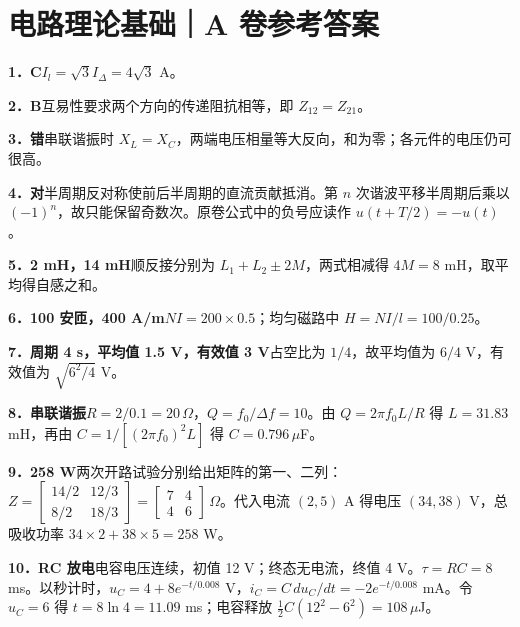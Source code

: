 \documentclass[UTF8,zihao=-4]{ctexart}
\newcommand{\ans}[2]{\par\medskip\noindent\textbf{#1}\quad #2\par}
\begin{document}
\section*{电路理论基础｜A 卷参考答案}
\ans{1．C}{$I_l=\sqrt3 I_\Delta=4\sqrt3$ A。}
\ans{2．B}{互易性要求两个方向的传递阻抗相等，即 $Z_{12}=Z_{21}$。}
\ans{3．错}{串联谐振时 $X_L=X_C$，两端电压相量等大反向，和为零；各元件的电压仍可很高。}
\ans{4．对}{半周期反对称使前后半周期的直流贡献抵消。第 $n$ 次谐波平移半周期后乘以 $(-1)^n$，故只能保留奇数次。原卷公式中的负号应读作 $u(t+T/2)=-u(t)$。}
\ans{5．2 mH，14 mH}{顺反接分别为 $L_1+L_2\pm2M$，两式相减得 $4M=8$ mH，取平均得自感之和。}
\ans{6．100 安匝，400 A/m}{$NI=200\times0.5$；均匀磁路中 $H=NI/l=100/0.25$。}
\ans{7．周期 4 s，平均值 1.5 V，有效值 3 V}{占空比为 $1/4$，故平均值为 $6/4$ V，有效值为 $\sqrt{6^2/4}$ V。}
\ans{8．串联谐振}{$R=2/0.1=20\,\Omega$，$Q=f_0/\Delta f=10$。由 $Q=2\pi f_0L/R$ 得 $L=31.83$ mH，再由 $C=1/[(2\pi f_0)^2L]$ 得 $C=0.796\,\mu$F。}
\ans{9．258 W}{两次开路试验分别给出矩阵的第一、二列：
$Z=\begin{bmatrix}14/2&12/3\\8/2&18/3\end{bmatrix}=\begin{bmatrix}7&4\\4&6\end{bmatrix}\,\Omega$。代入电流 $(2,5)$ A 得电压 $(34,38)$ V，总吸收功率 $34\times2+38\times5=258$ W。}
\ans{10．RC 放电}{电容电压连续，初值 12 V；终态无电流，终值 4 V。$\tau=RC=8$ ms。以秒计时，$u_C=4+8e^{-t/0.008}$ V，$i_C=C\,du_C/dt=-2e^{-t/0.008}$ mA。令 $u_C=6$ 得 $t=8\ln4=11.09$ ms；电容释放 $\tfrac12 C(12^2-6^2)=108\,\mu$J。}
\newpage
\end{document}
